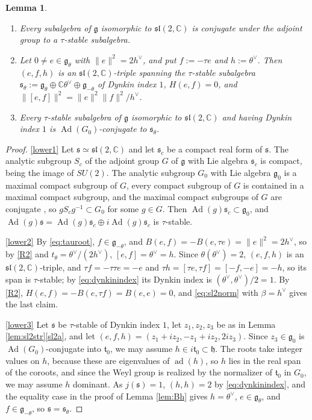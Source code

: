\documentclass [leqno, 10pt]{amsart}
\newtheorem{lemma}[theorem]{Lemma}%
\theoremstyle{definition}
\numberwithin{equation}{section}
\newcommand{\h}{\mathfrak{h}}
\newcommand{\sll}{\mathfrak{sl}}
\newcommand{\g}{\mathfrak{g}}
\newcommand{\ad}{\operatorname{ad}}
\newcommand{\Ad}{\operatorname{Ad}}
\newcommand{\com}{\mathbb C}
\newcommand{\gz}{\g_{0}}
\newcommand{\hv}{h^\vee}
\newcommand{\norm}[1]{\lVert #1\rVert}
\newcommand{\subs}{\mathfrak{s}}
\begin{document}
\begin{lemma}\label{lem:lower}
\leavevmode\noindent
\begin{enumerate}[label=(\arabic*), ref=(\arabic*)]
\item\label{lower1} Every subalgebra of $\g$ isomorphic to $\sll(2, \com)$ is conjugate under the adjoint group to a $\tau$-stable subalgebra.
\item\label{lower2} Let $0 \neq e \in \g_{\theta}$ with $\norm{e}^{2} = 2\hv$, and put $f := -\tau e$ and $h := \theta^{\vee}$. Then $(e, f, h)$ is an $\sll(2, \com)$-triple spanning the $\tau$-stable subalgebra $\subs_{\theta} := \g_{\theta} \oplus \com\theta^{\vee} \oplus \g_{-\theta}$ of Dynkin index $1$, $H(e, f) = 0$, and $\norm{[e, f]}^{2} = \norm{e}^{2}\norm{f}^{2}/\hv$.
\item\label{lower3} Every $\tau$-stable subalgebra of $\g$ isomorphic to $\sll(2, \com)$ and having Dynkin index $1$ is $\Ad(G_{0})$-conjugate to $\subs_{\theta}$.
\end{enumerate}
\end{lemma}
\begin{proof}
\ref{lower1} Let $\subs \simeq \sll(2, \com)$ and let $\subs_{c}$ be a compact real form of $\subs$. The analytic subgroup $S_{c}$ of the adjoint group $G$ of $\g$ with Lie algebra $\subs_{c}$ is compact, being the image of $SU(2)$. The analytic subgroup $G_{0}$ with Lie algebra $\gz$ is a maximal compact subgroup of $G$, every compact subgroup of $G$ is contained in a maximal compact subgroup, and the maximal compact subgroups of $G$ are conjugate \cite[Chapter VI]{Helgason}, so $gS_{c}g^{-1} \subset G_{0}$ for some $g \in G$. Then $\Ad(g)\subs_{c} \subset \gz$, and $\Ad(g)\subs = \Ad(g)\subs_{c} \oplus i\Ad(g)\subs_{c}$ is $\tau$-stable.

\ref{lower2} By \eqref{eq:tauroot}, $f \in \g_{-\theta}$, and $B(e, f) = -B(e, \tau e) = \norm{e}^{2} = 2\hv$, so by \ref{R2} and $t_{\theta} = \theta^{\vee}/(2\hv)$, $[e, f] = \theta^{\vee} = h$. Since $\theta(\theta^{\vee}) = 2$, $(e, f, h)$ is an $\sll(2, \com)$-triple, and $\tau f = -\tau\tau e = -e$ and $\tau h = [\tau e, \tau f] = [-f, -e] = -h$, so its span is $\tau$-stable; by \eqref{eq:dynkinindex} its Dynkin index is $(\theta^{\vee}, \theta^{\vee})/2 = 1$. By \ref{R2}, $H(e, f) = -B(e, \tau f) = B(e, e) = 0$, and \eqref{eq:sl2norm} with $\beta = \hv$ gives the last claim.

\ref{lower3} Let $\subs$ be $\tau$-stable of Dynkin index $1$, let $z_{1}, z_{2}, z_{3}$ be as in Lemma \ref{lem:sl2str}\ref{sl2a}, and let $(e, f, h) = (z_{1} + iz_{2}, -z_{1} + iz_{2}, 2iz_{3})$. Since $z_{3} \in \gz$ is $\Ad(G_{0})$-conjugate into $\mathfrak{t}_{0}$, we may assume $h \in i\mathfrak{t}_{0} \subset \h$. The roots take integer values on $h$, because these are eigenvalues of $\ad(h)$, so $h$ lies in the real span of the coroots, and since the Weyl group is realized by the normalizer of $\mathfrak{t}_{0}$ in $G_{0}$, we may assume $h$ dominant. As $j(\subs) = 1$, $(h, h) = 2$ by \eqref{eq:dynkinindex}, and the equality case in the proof of Lemma \ref{lem:Bh} gives $h = \theta^{\vee}$, $e \in \g_{\theta}$, and $f \in \g_{-\theta}$, so $\subs = \subs_{\theta}$.
\end{proof}
\end{document}
